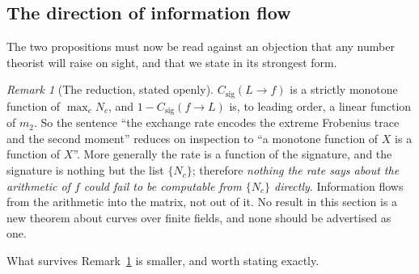\documentclass[11pt]{article}
\theoremstyle{definition}
\theoremstyle{plain}
\theoremstyle{remark}
\newtheorem{remark}[definition]{Remark}
\newcommand{\csig}{C_{\mathrm{sig}}}
\begin{document}
\subsection{The direction of information flow}
\label{sub:one-way}

The two propositions must now be read against an objection that any number
theorist will raise on sight, and that we state in its strongest form.

\begin{remark}[The reduction, stated openly]
\label{rem:reduction}
\(\csig(L\to f)\) is a strictly monotone function of \(\max_cN_c\), and
\(1-\csig(f\to L)\) is, to leading order, a linear function of \(m_2\).  So the
sentence ``the exchange rate encodes the extreme Frobenius trace and the second
moment'' reduces on inspection to ``a monotone function of \(X\) is a function
of \(X\)''.  More generally the rate is a function of the signature, and the
signature is nothing but the list \(\{N_c\}\); therefore \emph{nothing the rate
says about the arithmetic of \(f\) could fail to be computable from
\(\{N_c\}\) directly}.  Information flows from the arithmetic into the matrix,
not out of it.  No result in this section is a new theorem about curves over
finite fields, and none should be advertised as one.
\end{remark}

What survives Remark~\ref{rem:reduction} is smaller, and worth stating exactly.
\end{document}
